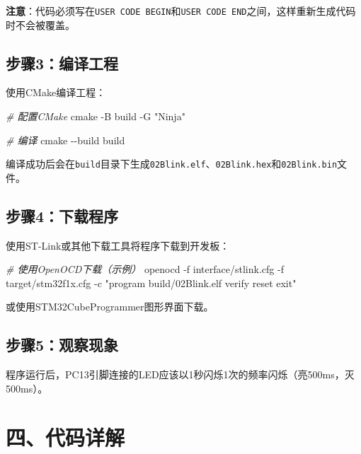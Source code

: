 \documentclass[
  chinese,
  UTF8,
  oneside,
  openany]{ctexbook}
\newenvironment{Shaded}{}{}
\newcommand{\AttributeTok}[1]{\textcolor[rgb]{0.49,0.56,0.16}{#1}}
\newcommand{\CommentTok}[1]{\textcolor[rgb]{0.38,0.63,0.69}{\textit{#1}}}
\newcommand{\ExtensionTok}[1]{#1}
\newcommand{\FunctionTok}[1]{\textcolor[rgb]{0.02,0.16,0.49}{#1}}
\newcommand{\NormalTok}[1]{#1}
\newcommand{\StringTok}[1]{\textcolor[rgb]{0.25,0.44,0.63}{#1}}
\begin{document}
\textbf{注意}：代码必须写在\texttt{USER\ CODE\ BEGIN}和\texttt{USER\ CODE\ END}之间，这样重新生成代码时不会被覆盖。

\subsection{步骤3：编译工程}\label{ux6b65ux9aa43ux7f16ux8bd1ux5de5ux7a0b}

使用CMake编译工程：

\begin{Shaded}
\begin{Highlighting}[]
\CommentTok{\# 配置CMake}
\FunctionTok{cmake} \AttributeTok{{-}B}\NormalTok{ build }\AttributeTok{{-}G} \StringTok{"Ninja"}

\CommentTok{\# 编译}
\FunctionTok{cmake} \AttributeTok{{-}{-}build}\NormalTok{ build}
\end{Highlighting}
\end{Shaded}

编译成功后会在\texttt{build}目录下生成\texttt{02Blink.elf}、\texttt{02Blink.hex}和\texttt{02Blink.bin}文件。

\subsection{步骤4：下载程序}\label{ux6b65ux9aa44ux4e0bux8f7dux7a0bux5e8f}

使用ST-Link或其他下载工具将程序下载到开发板：

\begin{Shaded}
\begin{Highlighting}[]
\CommentTok{\# 使用OpenOCD下载（示例）}
\ExtensionTok{openocd} \AttributeTok{{-}f}\NormalTok{ interface/stlink.cfg }\AttributeTok{{-}f}\NormalTok{ target/stm32f1x.cfg }\AttributeTok{{-}c} \StringTok{"program build/02Blink.elf verify reset exit"}
\end{Highlighting}
\end{Shaded}

或使用STM32CubeProgrammer图形界面下载。

\subsection{步骤5：观察现象}\label{ux6b65ux9aa45ux89c2ux5bdfux73b0ux8c61}

程序运行后，PC13引脚连接的LED应该以1秒闪烁1次的频率闪烁（亮500ms，灭500ms）。

\section{四、代码详解}\label{ux56dbux4ee3ux7801ux8be6ux89e3}
\end{document}
